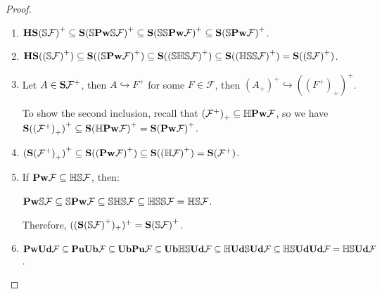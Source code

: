 \documentclass{article}
\theoremstyle{defin}
\theoremstyle{theorem}
\theoremstyle{claim}
\theoremstyle{prop}
\theoremstyle{lemma}
\theoremstyle{fact}
\theoremstyle{remark}
\theoremstyle{ex}
\theoremstyle{col}
\theoremstyle{question}
\begin{document}
\begin{proof} $ $

\begin{enumerate}
  \item ${\bf H S} {(\mathbb{S} \mathcal{F})}^{+} \subseteq {\bf S} {(\mathbb{S} {\bf Pw} \mathbb{S} \mathcal{F})}^{+} \subseteq {\bf S} {(\mathbb{S} \mathbb{S} {\bf Pw} \mathcal{F})}^{+} \subseteq {\bf S} {(\mathbb{S} {\bf Pw} \mathcal{F})}^{+}$.
  \item ${\bf HS} ({(\mathbb{S} \mathcal{F})}^{+}) \subseteq {\bf S} ({({\mathbb{S} {\bf Pw} \mathcal{F}})}^{+}) \subseteq {\bf S} ({({\mathbb{S} \mathbb{H} \mathbb{S} \mathcal{F}})}^{+}) \subseteq {\bf S} ({({\mathbb{H} \mathbb{S} \mathbb{S} \mathcal{F}})}^{+}) = {\bf S} ({({\mathbb{S} \mathcal{F}})}^{+})$.
  \item Let $A \in {\bf S} \mathcal{F}^+$, then $A \hookrightarrow F^{+}$ for some $F \in \mathcal{F}$, then
    ${(A_+)}^+ \hookrightarrow {({(F^+)}_+)}^+$.

    To show the second inclusion, recall that ${(\mathcal{F}^+)}_+ \subseteq \mathbb{H} {\bf Pw} \mathcal{F}$, so we have
      ${\bf S} {({(\mathcal{F}^+)}_+)}^+ \subseteq {\bf S} {(\mathbb{H} {\bf Pw} \mathcal{F})}^+ =  {\bf S} {({\bf Pw} \mathcal{F})}^+$.
  \item ${({\bf S}{(\mathcal{F}^+)}_+)}^+ \subseteq {\bf S}{({({\bf Pw} \mathcal{F})}^+)} \subseteq {\bf S}{({(\mathbb{H} \mathcal{F})}^+)} = {\bf S} (\mathcal{F}^+)$.
  \item If ${\bf Pw} \mathcal{F} \subseteq \mathbb{H} \mathbb{S} \mathcal{F}$, then:
  \begin{center}
    ${\bf Pw} \mathbb{S} \mathcal{F} \subseteq \mathbb{S} {\bf Pw} \mathcal{F} \subseteq \mathbb{S} \mathbb{H} \mathbb{S} \mathcal{F} \subseteq \mathbb{H} \mathbb{S} \mathbb{S} \mathcal{F} = \mathbb{H} \mathbb{S} \mathcal{F}$. 
  \end{center}
  Therefore, $(({\bf S} {(\mathbb{S} \mathcal{F})}^+)_+)^+ = {\bf S} {(\mathbb{S} \mathcal{F})}^+$.
  \item 
    ${\bf Pw} {\bf Ud} \mathcal{F} \subseteq {\bf Pu} {\bf Ub} \mathcal{F} \subseteq {\bf Ub} {\bf Pu} \mathcal{F} \subseteq {\bf Ub} \mathbb{H} \mathbb{S} {\bf Ud} \mathcal{F} \subseteq \mathbb{H} {\bf Ud} \mathbb{S} {\bf Ud} \mathcal{F} \subseteq \mathbb{H} \mathbb{S} {\bf Ud} {\bf Ud} \mathcal{F} = \mathbb{H} \mathbb{S} {\bf Ud} \mathcal{F}$.
\end{enumerate}
\end{proof}
\end{document}
